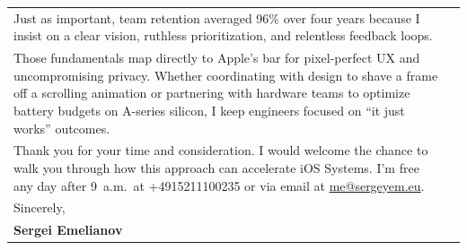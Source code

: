\documentclass[11pt, a4paper]{article}
\begin{document}
\begin{tabularx}{\textwidth}{@{\hspace{2cm}} p{4.5cm} @{\hspace{0.5cm}} X @{\hspace{2cm}}}
		Just as important, team retention averaged 96\% over four years because I insist on a clear vision, ruthless prioritization, and relentless feedback loops.\\[10pt]
		
		Those fundamentals map directly to Apple's bar for pixel-perfect UX and uncompromising privacy. Whether coordinating with design to shave a frame off a scrolling animation or partnering with hardware teams to optimize battery budgets on A-series silicon, I keep engineers focused on ``it just works'' outcomes.\\[10pt]
		
		Thank you for your time and consideration. I would welcome the chance to walk you through how this approach can accelerate iOS Systems. I'm free any day after 9~a.m.\ at +4915211100235 or via email at \href{mailto:me@sergeyem.eu}{me@sergeyem.eu}.\\[14pt]
		
		Sincerely,\\[6pt]
		{\bfseries\color{accentblue}Sergei Emelianov}
		
	\end{tabularx}
	
	\vspace{0.6cm}
	
\end{document}
